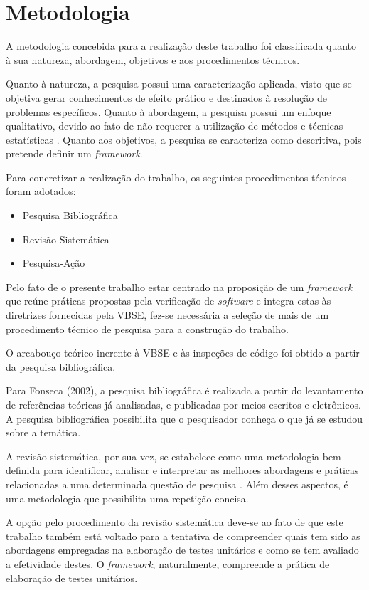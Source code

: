 \chapter{Metodologia}

A metodologia concebida para a realização deste trabalho foi classificada quanto à sua natureza, abordagem, objetivos e aos procedimentos técnicos.

Quanto à natureza, a pesquisa possui uma caracterização aplicada, visto que se objetiva gerar conhecimentos de efeito prático e destinados à resolução de problemas específicos. Quanto à abordagem, a pesquisa possui um enfoque qualitativo, devido ao fato de não requerer a utilização de métodos e técnicas estatísticas \cite{metodologia}. Quanto aos objetivos, a pesquisa se caracteriza como descritiva, pois pretende definir um \textit{framework}.

Para concretizar a realização do trabalho, os seguintes procedimentos técnicos foram adotados:

\begin{itemize}
	\item Pesquisa Bibliográfica
	\item Revisão Sistemática
	\item Pesquisa-Ação
\end{itemize}

Pelo fato de o presente trabalho estar centrado na proposição de um \textit{framework} que reúne práticas propostas pela verificação de \textit{software} e integra estas às diretrizes fornecidas pela VBSE, fez-se necessária a seleção de mais de um procedimento técnico de pesquisa para a construção do trabalho.
 
O arcabouço teórico inerente à VBSE e às inspeções de código foi obtido a partir da pesquisa bibliográfica.

Para Fonseca (2002), a pesquisa bibliográfica é realizada a partir do levantamento de referências teóricas já analisadas, e publicadas por meios escritos e eletrônicos. A pesquisa bibliográfica possibilita que o pesquisador conheça o que já se estudou sobre a temática.

A revisão sistemática, por sua vez, se estabelece como uma metodologia bem definida para identificar, analisar e interpretar as melhores abordagens e práticas relacionadas a uma determinada questão de pesquisa \cite{sistematica}. Além desses aspectos, é uma metodologia que possibilita uma repetição concisa.

A opção pelo procedimento da revisão sistemática deve-se ao fato de que este trabalho também está voltado para a tentativa de compreender quais tem sido as abordagens empregadas na elaboração de testes unitários e como se tem avaliado a efetividade destes. O \textit{framework}, naturalmente, compreende a prática de elaboração de testes unitários.

